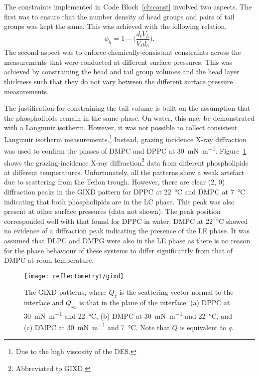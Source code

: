 The constraints implemented in Code Block~\ref{cb:const} involved two aspects.
The first was to ensure that the number density of head groups and pairs of tail groups was kept the same.
This was achieved with the following relation,\autocite{braun_polymers_2017}
%
\begin{equation}
\phi_h = 1 - \bigg(\frac{d_tV_h}{V_td_h}\bigg).
\label{equ:phih}
\end{equation}
%
The second aspect was to enforce chemically-consistant constraints across the measurements that were conducted at different surface pressures.
This was achieved by constraining the head and tail group volumes and the head layer thickness such that they do not vary between the different surface pressure measurements.

The justification for constraining the tail volume is built on the assumption that the phospholipids remain in the same phase.
On water, this may be demonstrated with a Langmuir isotherm.
However, it was not possible to collect consistent Langmuir isotherm measurements.\footnote{Due to the high viscosity of the DES.}
Instead, grazing incidence X-ray diffraction was used to confirm the phases of DMPC and DPPC at \SI{30}{\milli\newton\per\meter}.
Figure~\ref{fig:gixd} shows the grazing-incidence X-ray diffraction\footnote{Abbreviated to GIXD.} data from different phospholipids at different temperatures.
Unfortunately, all the patterns show a weak artefact due to scattering from the Teflon trough.
However, there are clear (2, 0) diffraction peaks in the GIXD pattern for DPPC at \SI{22}{\celsius} and DMPC at \SI{7}{\celsius} indicating that both phospholipids are in the LC phase.
This peak was also present at other surface pressures (data not shown).
The peak position corresponded well with that found for DPPC in water.\autocite{watkins_structure_2009}
DMPC at \SI{22}{\celsius} showed no evidence of a diffraction peak indicating the presence of the LE phase.
It was assumed that DLPC and DMPG were also in the LE phase as there is no reason for the phase behaviour of these systems to differ significantly from that of DMPC at room temperature.
%
\begin{figure}
    \centering
    \texttt{[image: reflectometry1/gixd]}
    \caption{The GIXD patterns, where $Q_z$ is the scattering vector normal to the interface and $Q_{xy}$ is that in the plane of the interface; (a) DPPC at \SI{30}{\milli\newton\per\meter} and \SI{22}{\celsius}, (b) DMPC at \SI{30}{\milli\newton\per\meter} and \SI{22}{\celsius}, and (c) DMPC at \SI{30}{\milli\newton\per\meter} and \SI{7}{\celsius}. Note that $Q$ is equivalent to $q$.}
    \label{fig:gixd}
\end{figure}
%

